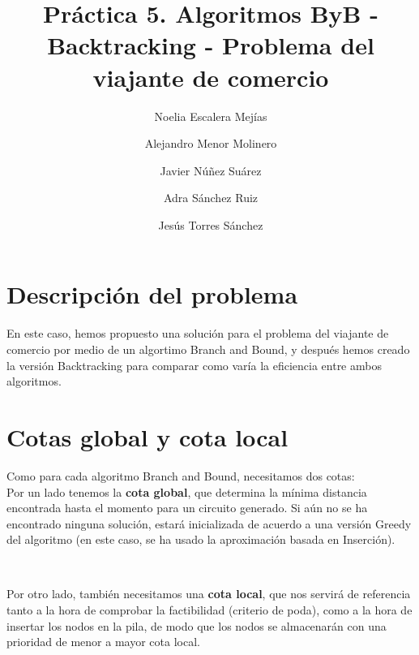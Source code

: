 \documentclass{article}
\title{Práctica 5. Algoritmos ByB - Backtracking - Problema del viajante de comercio}
\author{Noelia Escalera Mejías \\
	\and Alejandro Menor Molinero \\
	\and Javier Núñez Suárez \\
	\and Adra Sánchez Ruiz \\
	\and Jesús Torres Sánchez}
\begin{document}
	\maketitle
	\section{Descripción del problema}
	En este caso, hemos propuesto una solución para el problema del viajante de comercio por medio de un algortimo Branch and Bound, y después hemos creado la versión Backtracking para comparar como varía la eficiencia entre ambos algoritmos.
	
	\section{Cotas global y cota local}
	Como para cada algoritmo Branch and Bound, necesitamos dos cotas: \\
	Por un lado tenemos la \textbf{cota global}, que determina la mínima distancia encontrada hasta el momento para un circuito generado. Si aún no se ha encontrado ninguna solución, estará inicializada de acuerdo a una versión Greedy del algoritmo (en este caso, se ha usado la aproximación basada en Inserción).
	
	\
	
	Por otro lado, también necesitamos una \textbf{cota local}, que nos servirá de referencia tanto a la hora de comprobar la factibilidad (criterio de poda), como a la hora de insertar los nodos en la pila, de modo que los nodos se almacenarán con una prioridad de menor a mayor cota local.
	
	
\end{document}
